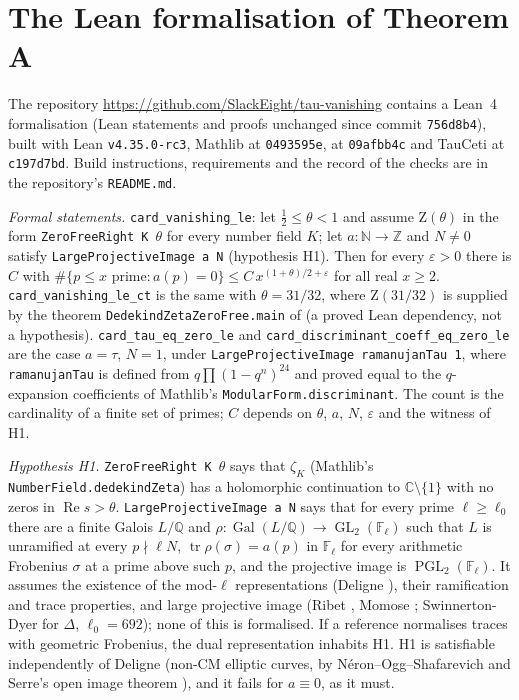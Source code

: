\documentclass[11pt]{amsart}
\theoremstyle{definition}
\theoremstyle{remark}
\newcommand{\Q}{\mathbb{Q}}
\newcommand{\Z}{\mathbb{Z}}
\newcommand{\C}{\mathbb{C}}
\newcommand{\F}{\mathbb{F}}
\DeclareMathOperator{\Gal}{Gal}
\DeclareMathOperator{\GL}{GL}
\DeclareMathOperator{\PGL}{PGL}
\DeclareMathOperator{\tr}{tr}
\newcommand{\Zt}{\mathrm{Z}}       %
\begin{document}
\appendix
\section{The Lean formalisation of Theorem A}\label{sec:lean}

The repository \url{https://github.com/SlackEight/tau-vanishing} contains a Lean~4 \cite{Lean4} formalisation (Lean
statements and proofs unchanged since commit \texttt{756d8b4}), built with Lean \texttt{v4.35.0-rc3}, Mathlib
\cite{Mathlib} at \texttt{0493595e}, \cite{CT-Lean} at \texttt{09afbb4c} and TauCeti \cite{TauCeti} at \texttt{c197d7bd}.
Build instructions, requirements and the record of the checks are in the repository's \texttt{README.md}.

\emph{Formal statements.} \texttt{card\_vanishing\_le}: let $\frac12\le\theta<1$ and assume $\Zt(\theta)$ in the form
\texttt{ZeroFreeRight K}~$\theta$ for every number field $K$; let $a:\mathbb N\to\Z$ and $N\ne0$ satisfy
\texttt{LargeProjectiveImage a N} (hypothesis H1). Then for every $\varepsilon>0$ there is $C$ with
$\#\{p\le x \text{ prime}:a(p)=0\}\le C\,x^{(1+\theta)/2+\varepsilon}$ for all real $x\ge2$.
\texttt{card\_vanishing\_le\_ct} is the same with $\theta=31/32$, where $\Zt(31/32)$ is supplied by the theorem
\texttt{DedekindZetaZeroFree.main} of \cite{CT-Lean} (a proved Lean dependency, not a hypothesis).
\texttt{card\_tau\_eq\_zero\_le} and \texttt{card\_discriminant\_\allowbreak coeff\_eq\_zero\_le} are the case $a=\tau$, $N=1$,
under \texttt{LargeProjectiveImage ramanujanTau 1}, where \texttt{ramanujanTau} is defined from $q\prod(1-q^n)^{24}$
and proved equal to the $q$-expansion coefficients of Mathlib's \texttt{ModularForm.discriminant}. The count is the
cardinality of a finite set of primes; $C$ depends on $\theta$, $a$, $N$, $\varepsilon$ and the witness of H1.

\emph{Hypothesis H1.} \texttt{ZeroFreeRight K}~$\theta$ says that $\zeta_K$ (Mathlib's \texttt{NumberField.dedekindZeta})
has a holomorphic continuation to $\C\setminus\{1\}$ with no zeros in $\operatorname{Re}s>\theta$. \texttt{LargeProjectiveImage a N}
says that for every prime $\ell\ge\ell_0$ there are a finite Galois $L/\Q$ and $\rho:\Gal(L/\Q)\to\GL_2(\F_\ell)$ such
that $L$ is unramified at every $p\nmid\ell N$, $\tr\rho(\sigma)=a(p)$ in $\F_\ell$ for every arithmetic Frobenius
$\sigma$ at a prime above such $p$, and the projective image is $\PGL_2(\F_\ell)$. It assumes the existence of the
mod-$\ell$ representations (Deligne \cite{Del71}), their ramification and trace properties, and large projective image
(Ribet \cite{Rib85}, Momose \cite{Mom81}; Swinnerton-Dyer \cite{SwD73} for $\Delta$, $\ell_0=692$); none of this is
formalised. If a reference normalises traces with geometric Frobenius, the dual representation inhabits H1. H1 is
satisfiable independently of Deligne (non-CM elliptic curves, by N\'eron--Ogg--Shafarevich and Serre's open image
theorem \cite{Serre72}), and it fails for $a\equiv0$, as it must.
\end{document}
